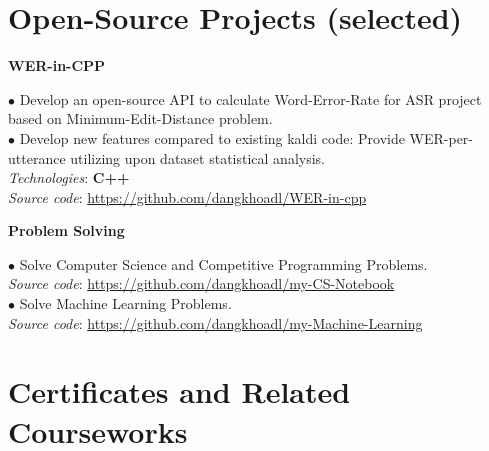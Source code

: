 \documentclass[10pt]{article}
\begin{document}
    \vspace{2mm}
    \section{Open-Source Projects (selected)}
        \begin{flushleft}
            \textbf{WER-in-CPP}
        \end{flushleft}
        \vspace{-1.5mm}
        $\bullet$ Develop an open-source API to calculate Word-Error-Rate for ASR project based on Minimum-Edit-Distance problem. \\
        $\bullet$ Develop new features compared to existing kaldi code: Provide WER-per-utterance utilizing upon dataset statistical analysis. \\    
            \emph{Technologies}: \textbf{C++} \\
            \emph{Source code}: \href{https://github.com/dangkhoadl/WER-in-cpp}{https://github.com/dangkhoadl/WER-in-cpp} \\

        \begin{flushleft}
            \textbf{Problem Solving}
        \end{flushleft}
        \vspace{-1.5mm}
        $\bullet$ Solve Computer Science and Competitive Programming Problems. \\
        	\emph{Source code}: \href{https://github.com/dangkhoadl/my-CS-Notebook}{https://github.com/dangkhoadl/my-CS-Notebook} \\
        $\bullet$ Solve Machine Learning Problems. \\
        	\emph{Source code}: \href{https://github.com/dangkhoadl/my-Machine-Learning}{https://github.com/dangkhoadl/my-Machine-Learning} \\


    \vspace{2mm}
    \section{Certificates and Related Courseworks}
\end{document}
